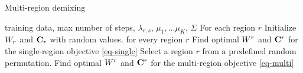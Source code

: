 \begin{algorithm}[tb]
   \caption{Multi-region demixing}
   \label{alg:multimix}
   \begin{algorithmic}[1]
    training data, max number of steps, $\lambda_{r,s}$, $\mu_1,\ldots\mu_K$, $\Sigma$
    For each region $r$
   \STATE \quad Initialize $W_r$ and $\mathbf{C}_r$ with random values.
    for every region $r$ 
   \STATE \quad Find optimal $W^r$ and $\mathbf{C}^r$ for the single-region objective \eqref{eq-single}
   \REPEAT
   \STATE Select a region $r$ from a predefined random permutation.
   \STATE Find optimal $W^r$ and $\mathbf{C}^r$ for the multi-region objective \eqref{eq-multi}
\end{algorithmic}
\end{algorithm}


